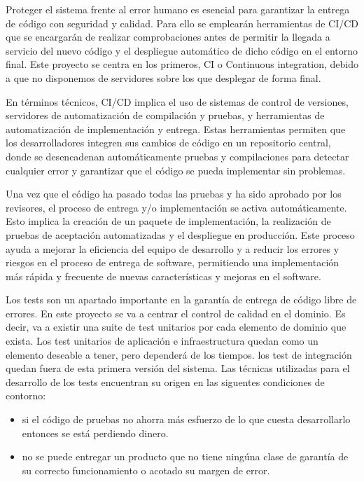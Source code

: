 Proteger el sistema frente al error humano es esencial para garantizar la entrega de código con seguridad y calidad. Para ello se emplearán herramientas de \gls{CI/CD} que se encargarán de realizar comprobaciones antes de permitir la llegada a servicio del nuevo código y el despliegue automático de dicho código en el entorno final. Este proyecto se centra en los primeros, CI o Continuous integration, debido a que no disponemos de servidores sobre los que desplegar de forma final.

En términos técnicos, CI/CD implica el uso de sistemas de control de versiones, servidores de automatización de compilación y pruebas, y herramientas de automatización de implementación y entrega. Estas herramientas permiten que los desarrolladores integren sus cambios de código en un repositorio central, donde se desencadenan automáticamente pruebas y compilaciones para detectar cualquier error y garantizar que el código se pueda implementar sin problemas.

Una vez que el código ha pasado todas las pruebas y ha sido aprobado por los revisores, el proceso de entrega y/o implementación se activa automáticamente. Esto implica la creación de un paquete de implementación, la realización de pruebas de aceptación automatizadas y el despliegue en producción. Este proceso ayuda a mejorar la eficiencia del equipo de desarrollo y a reducir los errores y riesgos en el proceso de entrega de software, permitiendo una implementación más rápida y frecuente de nuevas características y mejoras en el software.

Los tests son un apartado importante en la garantía de entrega de código libre de errores. En este proyecto se va a centrar el control de calidad en el dominio. Es decir, va a existir una suite de test unitarios por cada elemento de dominio que exista. Los test unitarios de aplicación e infraestructura quedan como un elemento deseable a tener, pero dependerá de los tiempos. los test de integración quedan fuera de esta primera versión del sistema. Las técnicas utilizadas para el desarrollo de los tests encuentran su origen en las siguentes condiciones de contorno:

\begin{itemize}
    \item si el código de pruebas no ahorra más esfuerzo de lo que cuesta desarrollarlo entonces se está perdiendo dinero.
    \item no se puede entregar un producto que no tiene ningúna clase de garantía de su correcto funcionamiento o acotado su margen de error.
\end{itemize}

